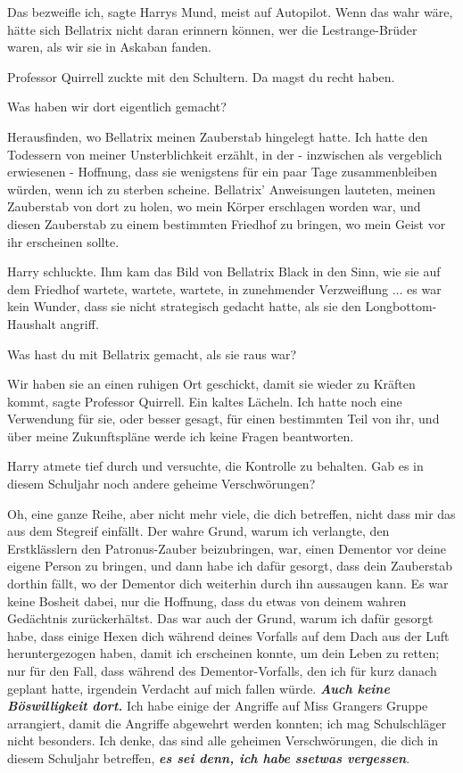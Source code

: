 \glqq{}Das bezweifle ich\grqq{}, sagte Harrys Mund, meist auf Autopilot. \glqq{}
Wenn das wahr wäre, hätte sich Bellatrix nicht daran erinnern können, wer die
Lestrange-Brüder waren, als wir sie in Askaban fanden.\grqq{}

Professor Quirrell zuckte mit den Schultern. \glqq{}Da magst du recht haben.\grqq{}

\glqq{}Was haben wir dort eigentlich gemacht?\grqq{}

\glqq{}Herausfinden, wo Bellatrix meinen Zauberstab hingelegt hatte. Ich hatte
den Todessern von meiner Unsterblichkeit erzählt, in der - inzwischen als
vergeblich erwiesenen - Hoffnung, dass sie wenigstens für ein paar Tage
zusammenbleiben würden, wenn ich zu sterben scheine. Bellatrix' Anweisungen
lauteten, meinen Zauberstab von dort zu holen, wo mein Körper erschlagen worden
war, und diesen Zauberstab zu einem bestimmten Friedhof zu bringen, wo mein
Geist vor ihr erscheinen sollte.\grqq{}

Harry schluckte. Ihm kam das Bild von Bellatrix Black in den Sinn, wie sie auf
dem Friedhof wartete, wartete, wartete, in zunehmender Verzweiflung ... es war
kein Wunder, dass sie nicht strategisch gedacht hatte, als sie den
Longbottom-Haushalt angriff.

\glqq{}Was hast du mit Bellatrix gemacht, als sie raus war?\grqq{}

\glqq{}Wir haben sie an einen ruhigen Ort geschickt, damit sie wieder zu Kräften
kommt\grqq{}, sagte Professor Quirrell. Ein kaltes Lächeln. \glqq{}Ich hatte noch
eine Verwendung für sie, oder besser gesagt, für einen bestimmten Teil von ihr,
und über meine Zukunftspläne werde ich keine Fragen beantworten.\grqq{}

Harry atmete tief durch und versuchte, die Kontrolle zu behalten. \glqq{}Gab es
in diesem Schuljahr noch andere geheime Verschwörungen?\grqq{}

\glqq{}Oh, eine ganze Reihe, aber nicht mehr viele, die dich betreffen, nicht
dass mir das aus dem Stegreif einfällt. Der wahre Grund, warum ich verlangte,
den Erstklässlern den Patronus-Zauber beizubringen, war, einen Dementor vor
deine eigene Person zu bringen, und dann habe ich dafür gesorgt, dass dein
Zauberstab dorthin fällt, wo der Dementor dich weiterhin durch ihn aussaugen
kann. Es war keine Bosheit dabei, nur die Hoffnung, dass du etwas von deinem
wahren Gedächtnis zurückerhältst. Das war auch der Grund, warum ich dafür
gesorgt habe, dass einige Hexen dich während deines Vorfalls auf dem Dach aus
der Luft heruntergezogen haben, damit ich erscheinen konnte, um dein Leben zu
retten; nur für den Fall, dass während des Dementor-Vorfalls, den ich für kurz
danach geplant hatte, irgendein Verdacht auf mich fallen würde.
\textbf{\emph{Auch keine Böswilligkeit dort.}} Ich habe einige der Angriffe auf
Miss Grangers Gruppe arrangiert, damit die Angriffe abgewehrt werden konnten;
ich mag Schulschläger nicht besonders. Ich denke, das sind alle geheimen
Verschwörungen, die dich in diesem Schuljahr betreffen, \textbf{\emph{es sei
denn, ich habe ssetwas vergessen}}.\grqq{}

